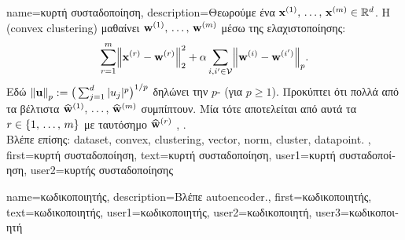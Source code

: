 {name={\foreignlanguage{greek}{κυρτή συσταδοποίηση}}, 
 	description={\foreignlanguage{greek}{Θεωρούμε ένα} 
		 ${\bf x}^{(1)}, \,\ldots, \,{\bf x}^{(m)} \in \mathbb{R}^{d}$. 
 		\foreignlanguage{greek}{Η}   (convex clustering) \foreignlanguage{greek}{μαθαίνει} 
		 ${\bf w}^{(1)}, \,\ldots, \,{\bf w}^{(m)}$ \foreignlanguage{greek}{μέσω της ελαχιστοποίησης}:
 		$$\sum_{\sampleidx=1}^{\samplesize} \normgeneric{\featurevec^{(\sampleidx)} - \weights^{(\sampleidx)}}{2}^2 + 
 		\regparam \sum_{\nodeidx,\nodeidx' \in \nodes} \normgeneric{\weights^{(\nodeidx)} - \weights^{(\nodeidx')}}{p}.$$ 
		\foreignlanguage{greek}{Εδώ} $\normgeneric{\vu}{p} \defeq \big( \sum_{\featureidx=1}^{\dimlocalmodel} |u_{\featureidx}|^{p} \big)^{1/p}$ 
		\foreignlanguage{greek}{δηλώνει την} $p$- (\foreignlanguage{greek}{για} $p\geq1$).  
		\foreignlanguage{greek}{Προκύπτει ότι πολλά από τα βέλτιστα}  
		$\widehat{{\bf w}}^{(1)}, \,\ldots, \,\widehat{{\bf w}}^{(m)}$ 
		\foreignlanguage{greek}{συμπίπτουν. Μία}  \foreignlanguage{greek}{τότε αποτελείται από αυτά τα} 
		\linebreak $r \in \{1, \,\ldots, \,m\}$ 
		\foreignlanguage{greek}{με ταυτόσημο} $\widehat{{\bf w}}^{(r)}$ \cite{JMLR:v22:18-694}, \cite{Pelckmans2005}.
		\\
		\foreignlanguage{greek}{Βλέπε επίσης:} \gls{dataset}, \gls{convex}, \gls{clustering}, \gls{vector}, \gls{norm}, \gls{cluster}, \gls{datapoint}. },
 	first={\foreignlanguage{greek}{κυρτή συσταδοποίηση}},
	text={\foreignlanguage{greek}{κυρτή συσταδοποίηση}},
	user1={\foreignlanguage{greek}{κυρτή συσταδοποίηση}}, %
	user2={\foreignlanguage{greek}{κυρτής συσταδοποίησης}} %
}

{name={\foreignlanguage{greek}{κωδικοποιητής}}, 
	description={\foreignlanguage{greek}{Βλέπε} \gls{autoencoder}.}, 
 	first={\foreignlanguage{greek}{κωδικοποιητής}},
 	text={\foreignlanguage{greek}{κωδικοποιητής}}, 
	user1={\foreignlanguage{greek}{κωδικοποιητής}}, %
    	user2={\foreignlanguage{greek}{κωδικοποιητή}}, %
	user3={\foreignlanguage{greek}{κωδικοποιητή}} %
}

